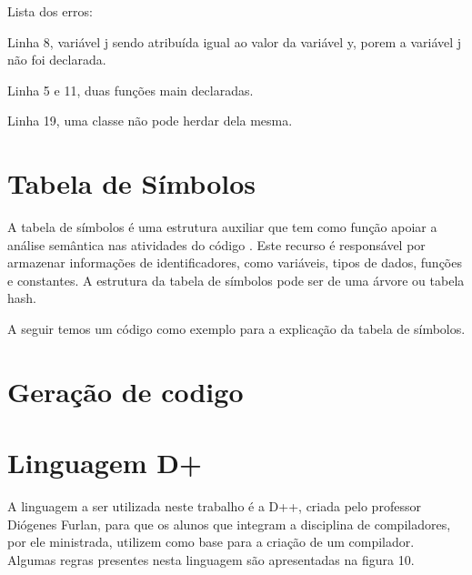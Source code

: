 \documentclass[12pt,oneside,a4paper,chapter=TITLE,section=TITLE,sumario=tradicional]{abntex2}
\begin{document}
Lista dos erros:

\begin{lista}
	\item Linha 8, variável j sendo atribuída igual ao valor da variável y, porem a variável j não foi declarada.
	\item Linha 5 e 11, duas funções main declaradas.
	\item Linha 19, uma classe não pode herdar dela mesma.
\end{lista}

\section{Tabela de Símbolos}
\label{sec:tabela-semantica}

A tabela de símbolos é uma estrutura auxiliar que tem como função apoiar a análise semântica nas atividades do código \cite{ricarte2008}. Este recurso é responsável por armazenar informações de identificadores, como variáveis, tipos de dados, funções e constantes. A estrutura da tabela de símbolos pode ser de uma árvore ou tabela hash.

A seguir temos um código como exemplo para a explicação da tabela de símbolos.

\begin{figure}[htb]
\end{figure}

\section{Geração de codigo}
\label{sec:geracao-de-codigo}

\section{Linguagem D+}
\label{sec:linguagem-d+}

A linguagem a ser utilizada neste trabalho é a D++, criada pelo professor Diógenes Furlan, para que os alunos que integram a disciplina de compiladores, por ele ministrada, utilizem como base para a criação de um compilador. Algumas regras presentes nesta linguagem são apresentadas na figura 10.

\begin{figure}[htb]
\end{figure}
\end{document}
